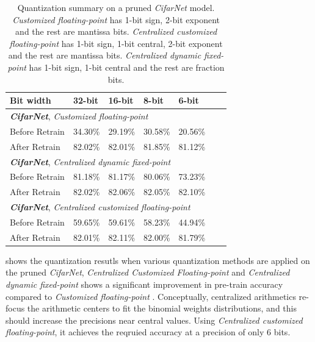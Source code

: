 \documentclass[a4paper,12pt]{report}
\begin{document}
\begin{table}[!h]
  \centering
  \begin{tabular}{lllllll}
    \hline
    \hline
    Bit width               &32-bit     &16-bit     &8-bit      &6-bit    \\
    \hline
    \hline
    \multicolumn{5}{l}{\textbf{\textit{CifarNet}}, \textit{Customized floating-point}}\\
    Before Retrain          &34.30\%    &29.19\%    &30.58\%    &20.56\%\\
    After Retrain           &82.02\%    &82.01\%    &81.85\%    &81.12\%\\
    \hline
    \hline
    \multicolumn{5}{l}{\textbf{\textit{CifarNet}}, \textit{Centralized dynamic fixed-point}}\\
    Before Retrain          &81.18\%    &81.17\%    &80.06\%    &73.23\%\\
    After Retrain           &82.02\%    &82.06\%    &82.05\%    &82.10\%\\
    \hline
    \hline
    \multicolumn{5}{l}{\textbf{\textit{CifarNet}}, \textit{Centralized customized floating-point}}\\
    Before Retrain          &59.65\%    &59.61\%   &58.23\%     &44.94\%\\
    After Retrain           &82.01\%    &82.11\%   &82.00\%     &81.79\%\\
    \hline
    \hline
  \end{tabular}
  \caption{Quantization summary on a pruned \textit{CifarNet} model. \textit{Customized
  floating-point} has 1-bit sign, 2-bit exponent and the rest are mantissa bits.
  \textit{Centralized customized floating-point} has 1-bit sign, 1-bit central,
  2-bit exponent and the rest are mantissa bits.
  \textit{Centralized dynamic fixed-point} has
  1-bit sign, 1-bit central and the rest are fraction bits.}
  \label{tab:pruned_quan2}
\end{table}


 shows the quantization resutls when various
quantization methods are applied on the
pruned \textit{CifarNet}, \textit{Centralized Customized Floating-point}
and \textit{Centralized dynamic fixed-point} shows a significant improvement in
pre-train accuracy compared to \textit{Customized floating-point} .
Conceptually, centralized arithmetics re-focus the arithmetic centers to fit
the binomial weights distributions, and this should increase the precisions near central
values.
Using \textit{Centralized customized floating-point}, it achieves the reqruied
accuracy at a precision of only $6$ bits.
\end{document}
